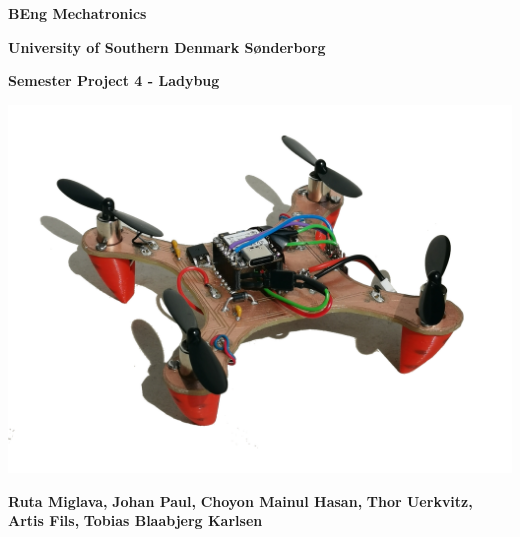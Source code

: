 \documentclass[titlepage,a4paper,12pt,]{article}
\begin{document}
\begin{titlepage}



\begin{center}


\noindent \textbf{BEng Mechatronics}

\noindent \textbf{University of Southern Denmark Sønderborg}

\Huge \bfseries{Semester Project 4 - Ladybug}

\end{center}

\begin{center}


\vspace*{0.1cm}


	\includegraphics[width = 10 cm]{pictures/FPP.png}

	\noindent \textbf{Ruta Miglava, }
	\noindent \textbf{Johan Paul, }
	\noindent \textbf{Choyon Mainul Hasan, }
	\noindent \textbf{Thor Uerkvitz, }
	\noindent \textbf{Artis Fils, }
	\noindent \textbf{Tobias Blaabjerg Karlsen}

	\vspace*{2cm}




\end{center}
\end{titlepage}
\end{document}
